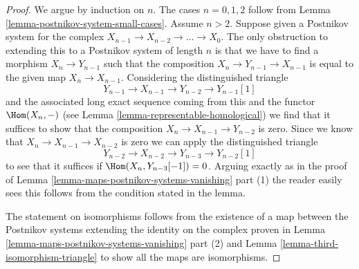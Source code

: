 \begin{proof}
We argue by induction on $n$. The cases $n = 0, 1, 2$
follow from Lemma \ref{lemma-postnikov-system-small-cases}.
Assume $n > 2$.
Suppose given a Postnikov system for the complex
$X_{n - 1} \to X_{n - 2} \to \ldots \to X_0$.
The only obstruction to extending this to a Postnikov system
of length $n$ is that we have to find a morphism
$X_n \to Y_{n - 1}$ such that the composition
$X_n \to Y_{n - 1} \to X_{n - 1}$ is equal to the given map
$X_n \to X_{n - 1}$. Considering the distinguished triangle
$$
Y_{n - 1} \to X_{n - 1} \to Y_{n - 2} \to Y_{n - 1}[1]
$$
and the associated long exact sequence coming from this
and the functor $\Hom(X_n, -)$
(see Lemma \ref{lemma-representable-homological})
we find that it suffices to show that the composition
$X_n \to X_{n - 1} \to Y_{n - 2}$ is zero.
Since we know that $X_n \to X_{n - 1} \to X_{n - 2}$ is zero
we can apply the distinguished triangle
$$
Y_{n - 2} \to X_{n - 2} \to Y_{n - 3} \to Y_{n - 2}[1]
$$
to see that it suffices if $\Hom(X_n, Y_{n - 3}[-1]) = 0$.
Arguing exactly as in the proof of
Lemma \ref{lemma-maps-postnikov-systems-vanishing} part (1)
the reader easily sees this follows from the condition
stated in the lemma.

\medskip\noindent
The statement on isomorphisms follows from the existence of a map
between the Postnikov systems extending the identity on the complex
proven in Lemma \ref{lemma-maps-postnikov-systems-vanishing} part (2)
and Lemma \ref{lemma-third-isomorphism-triangle} to show all the maps are
isomorphisms.
\end{proof}

















